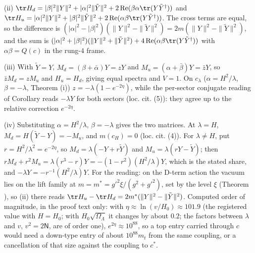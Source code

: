 (ii) $\tr H_{d} = |\beta|^{2}\|Y\|^{2} + |\alpha|^{2}\|\tilde{Y}\|^{2} + 2\operatorname{Re}(\beta\alpha\tr(Y\tilde{Y}^{\dagger}))$ and $\tr H_{u} = |\alpha|^{2}\|Y\|^{2} + |\beta|^{2}\|\tilde{Y}\|^{2} + 2\operatorname{Re}(\alpha\beta\tr(Y\tilde{Y}^{\dagger}))$. The cross terms are equal, so the difference is $(|\alpha|^{2} - |\beta|^{2})(\|Y\|^{2} - \|\tilde{Y}\|^{2}) = 2m(\|Y\|^{2} - \|\tilde{Y}\|^{2})$, and the sum is $(|\alpha|^{2} + |\beta|^{2})(\|Y\|^{2} + \|\tilde{Y}\|^{2}) + 4\operatorname{Re}(\alpha\beta\tr(Y\tilde{Y}^{\dagger}))$ with $\alpha\beta = Q(c)$ in the rung-$4$ frame.

(iii) With $\tilde{Y} = Y$, $M_{d} = (\beta + \bar{\alpha})Y = zY$ and $M_{u} = (\alpha + \bar{\beta})Y = \bar{z}Y$, so $\bar{z}M_{d} = zM_{u}$ and $H_{u} = H_{d}$, giving equal spectra and $V = 1$. On $c_{\lambda}$ ($\alpha = H^{2}/\lambda$, $\beta = -\lambda$, Theorem (i)) $z = -\lambda(1 - e^{-2\eta})$, while the per-sector conjugate reading of Corollary  reads $-\lambda Y$ for both sectors (loc. cit. (5)): they agree up to the relative correction $e^{-2\eta}$.

(iv) Substituting $\alpha = H^{2}/\lambda$, $\beta = -\lambda$ gives the two matrices. At $\lambda = H$, $M_{d} = H(\tilde{Y} - Y) = -M_{u}$, and $m(c_{H}) = 0$ (loc. cit. (4)). For $\lambda \ne H$, put $r = H^{2}/\lambda^{2} = e^{-2\eta}$, so $M_{d} = \lambda(-Y + r\tilde{Y})$ and $M_{u} = \lambda(rY - \tilde{Y})$; then $rM_{d} + r^{2}M_{u} = \lambda(r^{3} - r)Y = -(1 - r^{2})(H^{2}/\lambda)Y$, which is the stated share, and $-\lambda Y = -r^{-1}(H^{2}/\lambda)Y$. For the reading: on the D-term action the vacuum lies on the lift family at $m = m^{*} = g'^{2}\xi/(g^{2} + g'^{2})$, set by the level $\xi$ (Theorem ), so (ii) there reads $\tr H_{u} - \tr H_{d} = 2m^{*}(\|Y\|^{2} - \|\tilde{Y}\|^{2})$. Computed order of magnitude, in the proof text only: with $\eta \approx \ln(v/H_{0}) \approx 101.9$ (the registered value with $H = H_{0}$; with $H_{0}\sqrt{\Omega_{\Lambda}}$ it changes by about $0.2$; the factors between $\lambda$ and $v$, $v^{2} = 2\mathsf{N}$, are of order one), $e^{2\eta} \approx 10^{88}$, so a top entry carried through $c$ would need a down-type entry of about $10^{88}m_{t}$ from the same coupling, or a cancellation of that size against the coupling to $c^{*}$.

